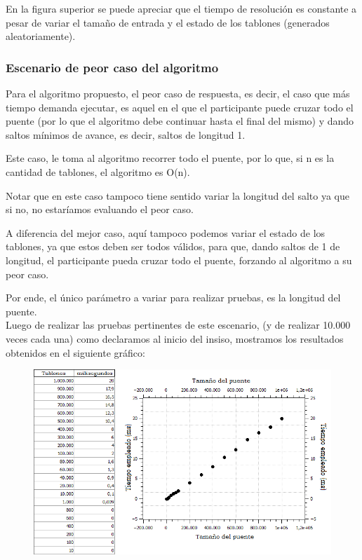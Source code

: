 \documentclass[10pt,a4paper]{article}
\begin{document}
\indent En la figura superior se puede apreciar que el tiempo de resolución es constante a pesar de variar el tamaño de entrada y el estado de los tablones (generados aleatoriamente).\\

\subsubsection{Escenario de peor caso del algoritmo}

\noindent Para el algoritmo propuesto, el peor caso de respuesta, es decir, el caso que más tiempo demanda ejecutar,  es aquel en el que el participante puede cruzar todo el puente (por lo que el algoritmo debe continuar hasta el final del mismo) y dando saltos mínimos de avance, es decir, saltos de longitud 1.

\noindent Este caso, le toma al algoritmo recorrer todo el puente, por lo que, si n es la cantidad de tablones, el algoritmo es O(n).

\noindent Notar que en este caso tampoco tiene sentido variar la longitud del salto ya que si no, no estaríamos evaluando el peor caso.

\noindent A diferencia del mejor caso, aquí tampoco podemos variar el estado de los tablones, ya que estos deben ser todos válidos, para que, dando saltos de 1 de longitud, el participante pueda cruzar todo el puente, forzando al algoritmo a su peor caso.

\noindent Por ende, el único parámetro a variar para realizar pruebas, es la longitud del puente.\\

\noindent Luego de realizar las pruebas pertinentes de este escenario, (y de realizar  10.000 veces cada una) como declaramos al inicio del insiso, mostramos los resultados obtenidos en el siguiente gráfico:\\

	\begin{figure}[h]
		\begin{center}
		   \includegraphics[scale=0.75]{casosDeTest/GRAFICOS/png/Ej1peorCasoPNG.png}
		\end{center}
	\end{figure}
\end{document}
